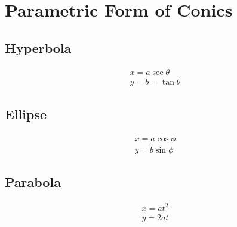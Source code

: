 \section{Parametric Form of Conics}
\small{\subsection{Hyperbola}}
\begin{align}
	x=a\sec \theta\\
	y=b=\tan \theta
\end{align}
\small{\subsection{Ellipse}}
\begin{align}
	x=a\cos\phi\\
	y=b\sin\phi
\end{align}
\small{\subsection{Parabola}}
\begin{align}
	x=at^2\\
	y=2at
\end{align}

